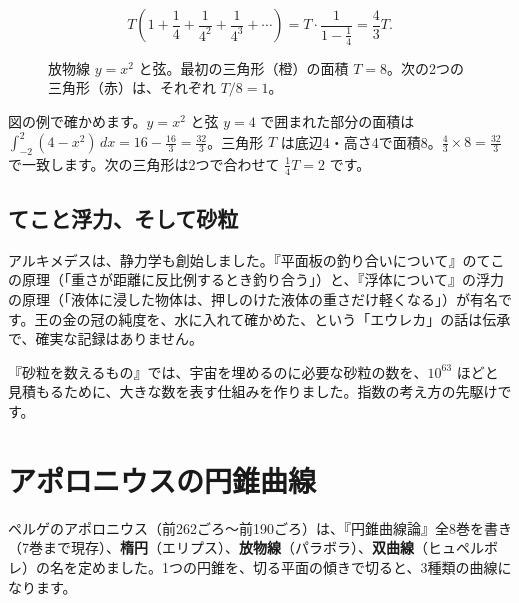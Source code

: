 \documentclass[a4paper,11pt,openany]{ltjsbook}
\begin{document}
\[
T\left(1+\frac14+\frac1{4^2}+\frac1{4^3}+\cdots\right)=T\cdot\frac{1}{1-\frac14}=\frac43T.
\]

\begin{figure}[htbp]
\centering
{}
\caption{放物線 $y=x^2$ と弦。最初の三角形（橙）の面積 $T=8$。次の2つの三角形（赤）は、それぞれ $T/8=1$。}
\end{figure}

図の例で確かめます。$y=x^2$ と弦 $y=4$ で囲まれた部分の面積は $\int_{-2}^{2}(4-x^2)\,dx=16-\tfrac{16}{3}=\tfrac{32}{3}$。三角形 $T$ は底辺4・高さ4で面積8。$\tfrac43\times8=\tfrac{32}{3}$ で一致します。次の三角形は2つで合わせて $\tfrac14T=2$ です。

\subsection{てこと浮力、そして砂粒}

アルキメデスは、静力学も創始しました。『平面板の釣り合いについて』のてこの原理（「重さが距離に反比例するとき釣り合う」）と、『浮体について』の浮力の原理（「液体に浸した物体は、押しのけた液体の重さだけ軽くなる」）が有名です。王の金の冠の純度を、水に入れて確かめた、という「エウレカ」の話は伝承で、確実な記録はありません。

『砂粒を数えるもの』では、宇宙を埋めるのに必要な砂粒の数を、$10^{63}$ ほどと見積もるために、大きな数を表す仕組みを作りました。指数の考え方の先駆けです。

\section{アポロニウスの円錐曲線}

ペルゲのアポロニウス（前262ごろ〜前190ごろ）は、『円錐曲線論』全8巻を書き（7巻まで現存）、\textbf{楕円}（エリプス）、\textbf{放物線}（パラボラ）、\textbf{双曲線}（ヒュペルボレ）の名を定めました。1つの円錐を、切る平面の傾きで切ると、3種類の曲線になります。
\end{document}
